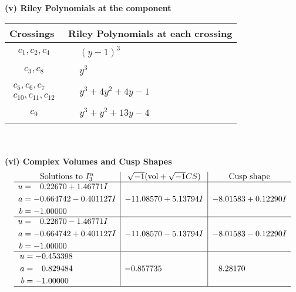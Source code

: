 \documentclass[1p]{elsarticle_modified}
\theoremstyle{definition}
\newcommand{\I}{\sqrt{-1}}
\begin{document}
\newpage\renewcommand{\arraystretch}{1}
\flushleft \textbf{(v) Riley Polynomials at the component}\newline \\
\begin{tabular}{m{50pt}|m{274pt}}
Crossings & \hspace{64pt}Riley Polynomials at each crossing \\
\hline $$\begin{aligned}c_{1},c_{2},c_{4}\end{aligned}$$&$\begin{aligned}
&(y-1)^3
\end{aligned}$\\
\hline $$\begin{aligned}c_{3},c_{8}\end{aligned}$$&$\begin{aligned}
&y^3
\end{aligned}$\\
\hline $$\begin{aligned}c_{5},c_{6},c_{7}\\c_{10},c_{11},c_{12}\end{aligned}$$&$\begin{aligned}
&y^3+4 y^2+4 y-1
\end{aligned}$\\
\hline $$\begin{aligned}c_{9}\end{aligned}$$&$\begin{aligned}
&y^3+y^2+13 y-4
\end{aligned}$\\
\hline
\end{tabular}\\~\\
\newpage\flushleft \textbf{(vi) Complex Volumes and Cusp Shapes}
$$\begin{array}{c|c|c}  
\text{Solutions to }I^u_{3}& \I (\text{vol} + \sqrt{-1}CS) & \text{Cusp shape}\\
 \hline 
\begin{aligned}
u &= \phantom{-}0.22670 + 1.46771 I \\
a &= -0.664742 - 0.401127 I \\
b &= -1.00000\phantom{ +0.000000I}\end{aligned}
 & -11.08570 + 5.13794 I & -8.01583 + 0.12290 I \\ \hline\begin{aligned}
u &= \phantom{-}0.22670 - 1.46771 I \\
a &= -0.664742 + 0.401127 I \\
b &= -1.00000\phantom{ +0.000000I}\end{aligned}
 & -11.08570 - 5.13794 I & -8.01583 - 0.12290 I \\ \hline\begin{aligned}
u &= -0.453398\phantom{ +0.000000I} \\
a &= \phantom{-}0.829484\phantom{ +0.000000I} \\
b &= -1.00000\phantom{ +0.000000I}\end{aligned}
 & -0.857735\phantom{ +0.000000I} & \phantom{-}8.28170\phantom{ +0.000000I}\\
 \hline 
 \end{array}$$\newpage\newpage\renewcommand{\arraystretch}{1}
\end{document}
